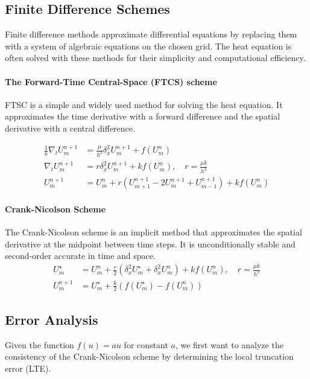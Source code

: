 \subsection{Finite Difference Schemes}
Finite difference methods approximate differential equations by replacing them with a system of algebraic equations on the chosen grid.
The heat equation is often solved with these methods for their simplicity and computational efficiency.

\paragraph{The Forward-Time Central-Space (FTCS) scheme}
FTSC is a simple and widely used method for solving the heat equation.
It approximates the time derivative with a forward difference and the spatial derivative with a central difference.

\begin{align*}
  \frac{1}{k} \nabla_t U_m^{n+1} & = \frac{\mu}{h^2} \delta_x^2 U_m^{n+1} + f(U_m^n)                                              \\
  \nabla_t U_m^{n+1}             & = r \delta_x^2 U_m^{n+1} + k f(U_m^n), \quad r = \frac{\mu k}{h^2}                             \\
  U_m^{n+1}                      & = U_m^n + r \left( U_{m+1}^{n+1} - 2 U_m^{n+1} + U_{m-1}^{n+1} \right) + k f(U_m^n) \tag{FTCS}
\end{align*}

\paragraph{Crank-Nicolson Scheme}

The Crank-Nicolson scheme is an implicit method that approximates the spatial derivative at the midpoint between time steps. It is unconditionally stable and second-order accurate in time and space.
\begin{align*}
  U_m^\star & = U_m^n + \frac{r}{2} \left( \delta_x^2 U_m^\star + \delta_x^2 U_m^n \right) + k f(U_m^n), \quad r = \frac{\mu k}{h^2} \tag{Crank-Nicolson} \\
  U_m^{n+1} & = U_m^\star + \frac{k}{2} \left( f(U_m^\star) - f(U_m^n) \right)
\end{align*}

\subsection{Error Analysis}
Given the function \(f(u) = au\) for constant \(a\), we first want to analyze the consistency of the Crank-Nicolson scheme by determining the local truncation error (LTE).

